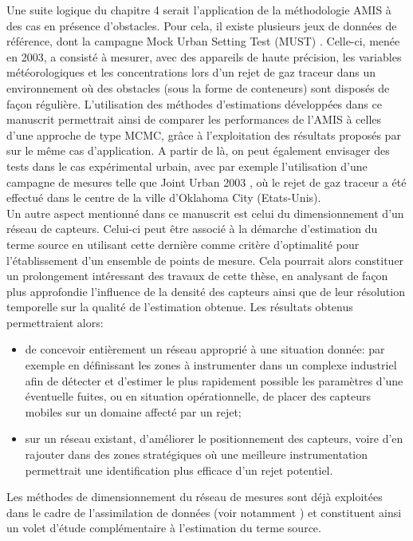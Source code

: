 Une suite logique du chapitre 4 serait l'application de la méthodologie AMIS à des cas  en présence d'obstacles. Pour cela, il existe plusieurs jeux de données de référence, dont la campagne Mock Urban Setting Test (MUST) \cite{Yee2004}. Celle-ci, menée en 2003, a consisté à mesurer, avec des appareils de haute précision, les variables météorologiques et les concentrations lors d'un rejet de gaz traceur dans un environnement où des obstacles (sous la forme de conteneurs) sont disposés de façon régulière. L'utilisation des méthodes d'estimations développées dans ce manuscrit permettrait ainsi de comparer les performances de l'AMIS à celles d'une approche de type MCMC, grâce à l'exploitation des résultats proposés par \cite{Keats2007} sur le même cas d'application. A partir de là, on peut également envisager des tests dans le cas expérimental urbain, avec par exemple l'utilisation d'une campagne de mesures telle que Joint Urban 2003 \cite{Allwine2004}, où le rejet de gaz traceur a été effectué dans le centre de la ville d'Oklahoma City (Etats-Unis).\\

Un autre aspect mentionné dans ce manuscrit est celui du dimensionnement d'un réseau de capteurs. Celui-ci peut être associé à la démarche d'estimation du terme source en utilisant cette dernière comme critère d'optimalité pour l'établissement d'un ensemble de points de mesure. Cela pourrait alors constituer un prolongement intéressant des travaux de cette thèse, en analysant de façon plus approfondie l'influence de la densité des capteurs ainsi que de leur résolution temporelle sur la qualité de l'estimation obtenue. Les résultats obtenus permettraient alors: 
\begin{itemize}
	\item de concevoir entièrement un réseau approprié à une situation donnée: par exemple en définissant les zones à instrumenter dans un complexe industriel afin de détecter et d'estimer le plus rapidement possible les paramètres d'une éventuelle fuites, ou en situation opérationnelle, de placer des capteurs mobiles sur un domaine affecté par un rejet;
	\item sur un réseau existant, d'améliorer le positionnement des capteurs, voire d'en rajouter dans des zones stratégiques où une meilleure instrumentation permettrait une identification plus efficace d'un rejet potentiel.
\end{itemize}

Les méthodes de dimensionnement du réseau de mesures sont déjà exploitées dans le cadre de l'assimilation de données (voir notamment \cite{Abida2009}) et constituent ainsi un volet d'étude complémentaire à l'estimation du terme source.\\

